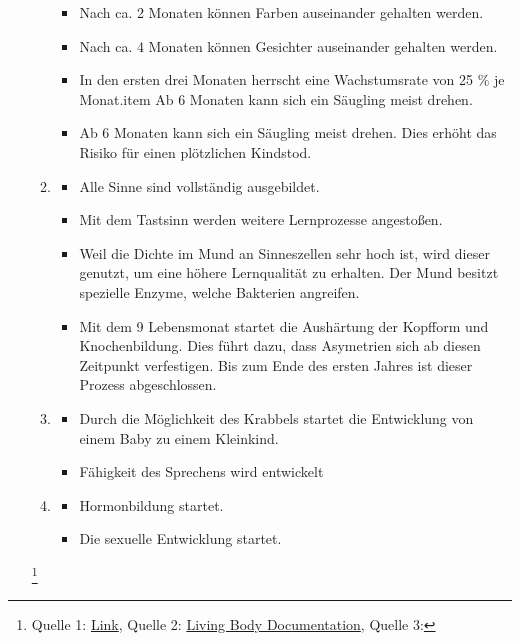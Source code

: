 \begin{itemize}
\begin{enumerate}
\begin{itemize}
		\item Nach ca. 2 Monaten können Farben auseinander gehalten werden.
		\item Nach ca. 4 Monaten können Gesichter auseinander gehalten werden.
		\item In den ersten drei Monaten herrscht eine Wachstumsrate von 25 $\%$ je Monat.item Ab 6 Monaten kann sich ein Säugling meist drehen.
		\item Ab 6 Monaten kann sich ein Säugling meist drehen. Dies erhöht das Risiko für einen plötzlichen Kindstod.
	\end{itemize}
	\item[0 Jahre - 8 Monate]
	\begin{itemize}
		\item Alle Sinne sind vollständig ausgebildet.
		\item Mit dem Tastsinn werden weitere Lernprozesse angestoßen.
		\item Weil die Dichte im Mund an Sinneszellen sehr hoch ist, wird dieser genutzt, um eine höhere Lernqualität zu erhalten. Der Mund besitzt spezielle Enzyme, welche Bakterien angreifen.
		\item Mit dem 9 Lebensmonat startet die Aushärtung der Kopfform und Knochenbildung. Dies führt dazu, dass Asymetrien sich ab diesen Zeitpunkt verfestigen. Bis zum Ende des ersten Jahres ist dieser Prozess abgeschlossen.
	\end{itemize}
	\item[1 Jahr]
	\begin{itemize}
		\item Durch die Möglichkeit des Krabbels startet die Entwicklung von einem Baby zu einem Kleinkind.
		\item Fähigkeit des Sprechens wird entwickelt
	\end{itemize}
	\item[11 Jahren]
	\begin{itemize}
		\item Hormonbildung startet.
		\item Die sexuelle Entwicklung startet.
	\end{itemize}
\end{enumerate}
\footnote{
	Quelle 1: \href{https://www.ipzf.de/gehirnentwicklung.html}{Link},
	Quelle 2: \href{https://www.youtube.com/watch?v=ZNYv_ory8rc}{Living Body Documentation},
	Quelle 3: %
}




\end{itemize}
